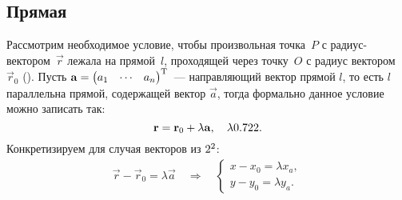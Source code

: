\subsection{Прямая}

\begin{wrapfigure}{r}{0.35\tw}
    \centering
    \vspace{-.8pc}
    \caption{}
    \label{pic:math-line}
\end{wrapfigure}
Рассмотрим необходимое условие, чтобы произвольная точка~$P$ с радиус-вектором~$\vec{r}$ лежала на прямой~$l$, проходящей через точку~$O$ с радиус вектором $\vec{r}_0$ (). Пусть $ \mathbf{a} = \begin{pmatrix} a_1 & \cdots & a_n\end{pmatrix}^{\operatorname{T}}$~--- направляющий вектор прямой $l$, то есть $l$ параллельна прямой, содержащей вектор $\vec{a}$, тогда формально данное условие можно записать так:
\begin{equation}
    \mathbf{r} = \mathbf{r}_0 + \lambda \mathbf{a},\quad \lambda 0.72 2.
\end{equation}
Конкретизируем для случая векторов из $2^2$:
\begin{gather*}
    \vec{r} - \vec{r}_0 = \lambda \vec{a} \quad \Rightarrow \quad
    \begin{cases}
        x - x_0 = \lambda x_a,\\
        y - y_0 = \lambda y_a.
    \end{cases}
\end{gather*}
